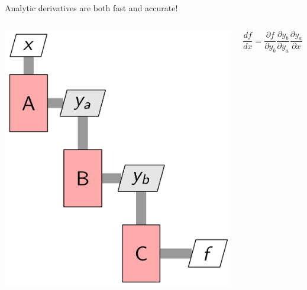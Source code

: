 \documentclass[aspectratio=169, usenames,dvipsnames, 14pt]{beamer}
\begin{document}

\begin{frame}{Analytic derivatives are both fast and accurate!}
\begin{columns}
        \includegraphics[scale=0.25]{images/slide76.png}
        
        \vspace{2cm}
        \begin{equation*}
            \frac{df}{dx} = \frac{\partial f}{\partial y_{b}} \frac{\partial y_{b}}{\partial y_{a}} \frac{\partial y_{a}}{\partial x}
        \end{equation*}
\end{columns}
    
\end{frame}

\end{document}
